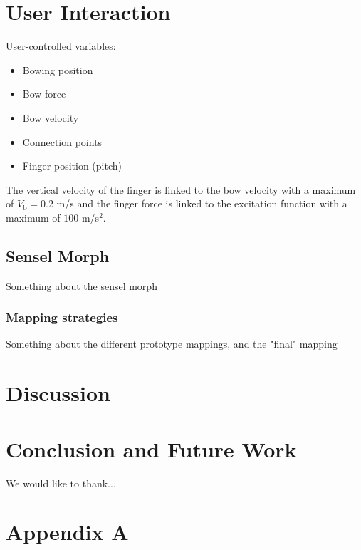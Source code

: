\documentclass{article}
\begin{document}
\section{User Interaction}
User-controlled variables:
\begin{itemize}
    \item Bowing position
    \item Bow force
    \item Bow velocity
    \item Connection points
    \item Finger position (pitch)
\end{itemize}

The vertical velocity of the finger is linked to the bow velocity with a maximum of $V_\text{b} = 0.2$ m/s and the finger force is linked to the excitation function with a maximum of $100$ m/s$^2$.

\subsection{Sensel Morph}
Something about the sensel morph
\subsubsection{Mapping strategies}
Something about the different prototype mappings, and the "final" mapping 

\section{Discussion}


\section{Conclusion and Future Work}

\begin{acknowledgments}
We would like to thank...
\end{acknowledgments} 



\section{Appendix A}
\end{document}
